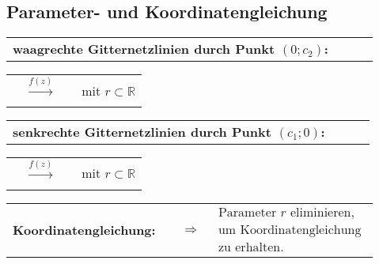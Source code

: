 \subsection{Parameter- und Koordinatengleichung}
	\begin{minipage}[]{0.2\textwidth}
		\scalebox{0.5}{}
	\end{minipage}
	\begin{minipage}[]{0.8\textwidth}
		\begin{tabular}{llll}
			\textbf{waagrechte Gitternetzlinien durch Punkt $(0; c_2)$:} & &\\[3pt]
		\end{tabular}
		\begin{tabular}{llll}
			\fbox{$z = \operatorname{z}\left( r \right) = r + \mathrm{j} c_2$} & $\xrightarrow[]{f\left( z \right)}$ & \fbox{$w = \operatorname{w}\left( r \right) = f\left( \operatorname{z}\left( r \right) \right) = f\left( r + \mathrm{j} c_2 \right)$} & mit $r \subset \mathbb{R}$\\[3pt]
		\end{tabular}
		\begin{tabular}{llll}
			\textbf{senkrechte Gitternetzlinien durch Punkt $(c_1; 0)$:} & & &\\[3pt]
		\end{tabular}
		\begin{tabular}{llll}
			\fbox{$z = \operatorname{z}\left( r \right) = c_1 + \mathrm{j} r$} & $\xrightarrow[]{f\left( z \right)}$ & \fbox{$w = \operatorname{w}\left( r \right) = f\left( \operatorname{z}\left( r \right) \right) = f\left( c_1 + \mathrm{j} r \right)$} & mit $r \subset \mathbb{R}$\\[3pt]
		\end{tabular}
		\begin{tabular}{llll}
			\textbf{Koordinatengleichung:} & 
			\fbox{$\left| \begin{array}{c}
				w_1 = \operatorname{Re}\left(\left[ f\left(\operatorname{z}\left(r \right)\right)\right]\right)\\[3pt]
				w_2 = \operatorname{Re}\left(\left[ f\left(\operatorname{z}\left(r \right)\right)\right]\right)
				\end{array} \right|$} &
			$\Rightarrow$ & 
			$\begin{array}{l}
				\text{Parameter $r$ eliminieren,}\\[3pt]
				\text{um Koordinatengleichung}\\[3pt]
				\text{zu erhalten.}
			\end{array}$
		\end{tabular}
	\end{minipage}

